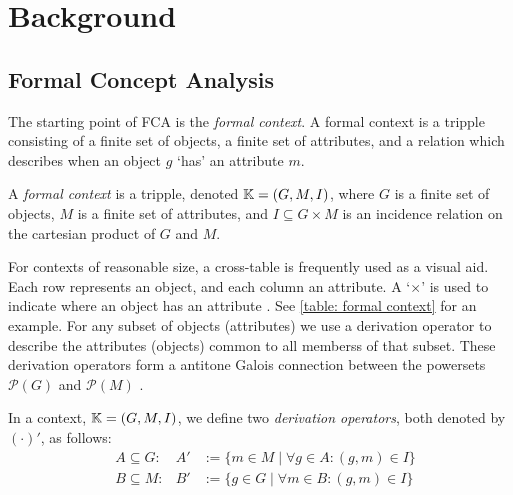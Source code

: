 \section{Background}
\label{section: background}
\subsection{Formal Concept Analysis}
\label{subsection: formal concept analysis}
The starting point of FCA is the \textit{formal context}. A formal context is a tripple consisting of a finite set of objects, a finite set of attributes, and a relation which describes when an object $g$ `has' an attribute $m$.
%
\begin{definition}
    \label{definition: formal context}
    A \emph{formal context} is a tripple, denoted $\mathbb{K} = (G,M,I)$, where $G$ is a finite set of objects, $M$ is a finite set of attributes, and $I \subseteq G\times M$ is an incidence relation on the cartesian product of $G$ and $M$.
\end{definition}
%
For contexts of reasonable size, a cross-table is frequently used as a visual aid. Each row represents an object, and each column an attribute. A `$\times$' is used to indicate where an object has an attribute \cite{ganter1999formal,ganter2016conceptual}. See \autoref{table: formal context} for an example.
For any subset of objects (attributes) we use a derivation operator to describe the attributes (objects) common to all memberss of that subset. These derivation operators form a antitone Galois connection between the powersets $\mathcal{P}(G)$ and $\mathcal{P}(M)$ \cite{ganter1999formal}.
%
\begin{definition}
    \label{definition: derivation operators}
    In a context, $\mathbb{K} = (G,M,I)$, we define two \emph{derivation operators}, both denoted by $(\cdot)'$, as follows:
    \[
        \begin{aligned}
             & A \subseteq G: & A' & := \{m \in M \mid \forall g \in A: (g,m) \in I\} \\
             & B \subseteq M: & B' & := \{g \in G \mid \forall m \in B: (g,m) \in I\}
        \end{aligned}
    \]
\end{definition}

